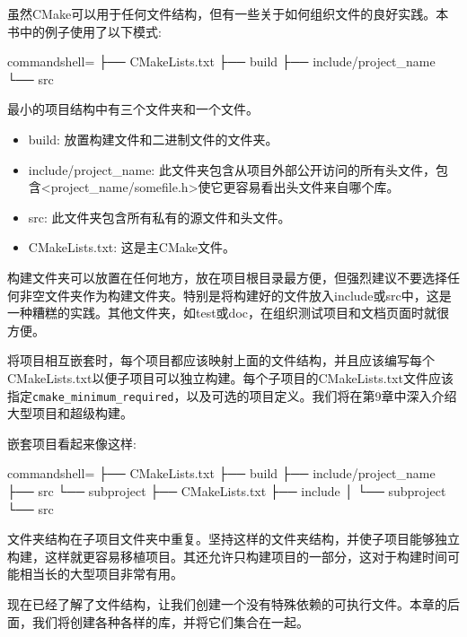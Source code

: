 虽然CMake可以用于任何文件结构，但有一些关于如何组织文件的良好实践。本书中的例子使用了以下模式:

\begin{tcblisting}{commandshell={}}
├── CMakeLists.txt
├── build
├── include/project_name
└── src
\end{tcblisting}

最小的项目结构中有三个文件夹和一个文件。

\begin{itemize}
\item 
build: 放置构建文件和二进制文件的文件夹。

\item 
include/project\_name: 此文件夹包含从项目外部公开访问的所有头文件，包含<project\_name/somefile.h>使它更容易看出头文件来自哪个库。

\item 
src: 此文件夹包含所有私有的源文件和头文件。

\item 
CMakeLists.txt: 这是主CMake文件。
\end{itemize}

构建文件夹可以放置在任何地方，放在项目根目录最方便，但强烈建议不要选择任何非空文件夹作为构建文件夹。特别是将构建好的文件放入include或src中，这是一种糟糕的实践。其他文件夹，如test或doc，在组织测试项目和文档页面时就很方便。


将项目相互嵌套时，每个项目都应该映射上面的文件结构，并且应该编写每个CMakeLists.txt以便子项目可以独立构建。每个子项目的CMakeLists.txt文件应该指定\texttt{cmake\_minimum\_required}，以及可选的项目定义。我们将在第9章中深入介绍大型项目和超级构建。

嵌套项目看起来像这样:

\begin{tcblisting}{commandshell={}}
├── CMakeLists.txt
├── build
├── include/project_name
├── src
└── subproject
        ├── CMakeLists.txt
        ├── include
        │       └── subproject
        └── src
\end{tcblisting}

文件夹结构在子项目文件夹中重复。坚持这样的文件夹结构，并使子项目能够独立构建，这样就更容易移植项目。其还允许只构建项目的一部分，这对于构建时间可能相当长的大型项目非常有用。

现在已经了解了文件结构，让我们创建一个没有特殊依赖的可执行文件。本章的后面，我们将创建各种各样的库，并将它们集合在一起。


















